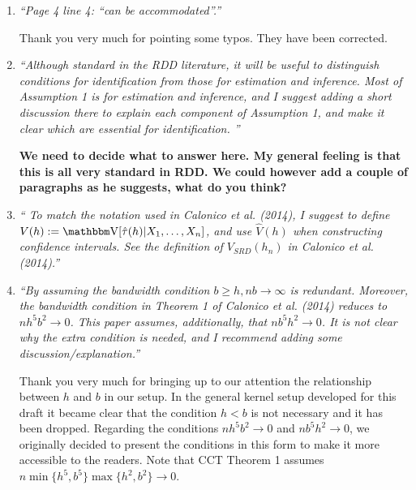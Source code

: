\documentclass[12pt,fleqn]{article}
\begin{document}
\begin{enumerate}

 \item  \textit{``Page 4 line 4: ``can be accommodated''.''}

 Thank you very much for pointing some typos. They have been corrected.

\item \textit{``Although standard in the RDD literature, it will be useful to distinguish conditions for identification from those for estimation and inference. Most of Assumption 1 is for
estimation and inference, and I suggest adding a short discussion there to explain each component of Assumption 1, and make it clear which are essential for identification. ''}

   \textbf{We need to decide what to answer here. My general feeling is that this is all very standard in RDD. We could however add a couple of paragraphs as he suggests, what do you think?}

\item \textit{`` To match the notation used in Calonico et al. (2014), I suggest to define $V(h) :=\V[\hat{\tau}(h)|X_{1}, \dots ,X_{n}]$, and use $\hat{V}(h)$ when constructing confidence intervals. See the definition of $V_{SRD}(h_{n})$ in Calonico et al. (2014).''}


\item \textit{``By assuming the bandwidth condition $b \geq h, nb \rightarrow \infty$ is redundant. Moreover, the bandwidth condition in Theorem 1 of Calonico et al. (2014) reduces to $nh^{5}b^{2} \rightarrow 0$. This paper assumes, additionally, that $nb^{5}h^{2} \rightarrow 0$. It is not clear why the extra condition is needed, and I recommend adding some discussion/explanation.''}

  Thank you very much for bringing up to our attention the relationship between $h$ and $b$ in our setup. In the general kernel setup developed for this draft it became clear that the condition $h<b$ is not necessary and it has been dropped. Regarding the conditions $nh^{5}b^{2} \rightarrow 0$ and $nb^{5}h^{2} \rightarrow 0$, we originally decided to present the conditions in this form to make it more accessible to the readers. Note that CCT Theorem 1 assumes $n \min\{h^{5},b^{5}\}\max\{h^{2}, b^{2}\} \rightarrow 0$.



\end{enumerate}
\end{document}
